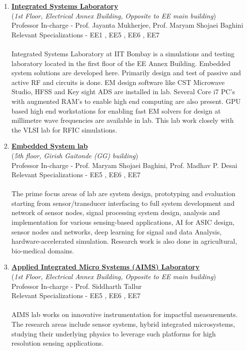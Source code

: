 \documentclass[openany]{book} %
\begin{document}
\begin{enumerate}
\item \href{https://www.ee.iitb.ac.in/web/research/labs/isl} {\color{blue} \textbf{Integrated Systems Laboratory}}\\
    (\textit{1st Floor, Electrical Annex Building, Opposite to EE main building})\\
    Professor In-charge - Prof. Jayanta Mukherjee, Prof. Maryam Shojaei Baghini\\
Relevant Specializations - EE1 , EE5 , EE6 , EE7\\
\\
Integrated Systems Laboratory at IIT Bombay is a simulations and testing laboratory located in the first floor of the EE Annex Building. Embedded system solutions are developed here. Primarily design and test of passive and active RF and circuits is done. EM design software like CST Microwave Studio, HFSS and Key sight ADS are installed in lab. Several Core i7 PC's with augmented RAM's to enable high end computing are also present. GPU based high end workstations for enabling fast EM solvers for design at millimetre wave frequencies are available in lab. This lab work closely with the VLSI lab for RFIC simulations.\\


\item \href{https://www.ee.iitb.ac.in/web/research/labs/emsys} {\color{blue} \textbf{Embedded System lab}}\\
    (\textit{5th floor, Girish Gaitonde (GG) building})\\
    Professor In-charge - Prof. Maryam Shojaei Baghini, Prof. Madhav P. Desai\\
Relevant Specializations - EE5 , EE6 , EE7\\
\\
The prime focus areas of lab are system design, prototyping and evaluation starting from sensor/transducer interfacing to full system development and network of sensor nodes, signal processing system design, analysis and implementation for various sensing-based applications, AI for ASIC design, sensor nodes and networks, deep learning for signal and data Analysis, hardware-accelerated simulation. Research work is also done in agricultural, bio-medical domains.\\

\item \href{http://www.ee.iitb.ac.in/~stallur/index.php/} {\color{blue} \textbf{Applied Integrated Micro Systems (AIMS) Laboratory}}\\
    (\textit{1st Floor, Electrical Annex Building, Opposite to EE main building})\\
    Professor In-charge - Prof. Siddharth Tallur\\
Relevant Specializations - EE5 , EE6 , EE7\\
\\
AIMS lab works on  innovative instrumentation for impactful measurements. The research areas include sensor systems, hybrid integrated microsystems,  studying their underlying physics  to leverage such platforms for high resolution sensing applications.\\


\end{enumerate}
\end{document}

